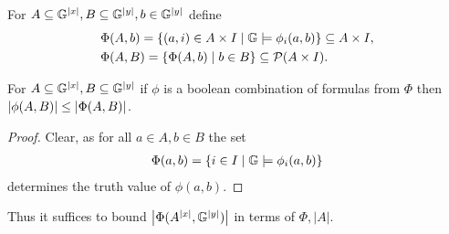\begin{Definition}
  For $A \subseteq \mathbb G^{|x|}, B \subseteq \mathbb G^{|y|}, b \in \mathbb G^{|y|}$ define
  \begin{align*}
    &\Phi(A, b) = \left\{(a, i) \in A \times I \mid \mathbb G \models \phi_i(a, b) \right\} \subseteq A \times I, \\
    &\Phi(A, B) = \left\{\Phi(A, b) \mid b \in B \right\} \subseteq \mathcal P(A \times I).
  \end{align*}  
\end{Definition}

\begin{Lemma}
  For $A \subseteq \mathbb G^{|x|}, B \subseteq \mathbb G^{|y|}$
  if $\phi$ is a boolean combination of formulas from $\Phi$ then
    $\left|\phi(A, B)\right| \leq \left|\Phi(A, B)\right|$.
\end{Lemma}
\begin{proof}
  Clear, as for all $a \in A, b \in B$ the set
  \begin{align*}
    \Phi(a, b) = \left\{i \in I \mid \mathbb G \models \phi_i(a, b)\right\}
  \end{align*}
  determines the truth value of $\phi(a,b)$.
\end{proof}

Thus it suffices to bound  $\left|\Phi(A^{|x|}, \mathbb G^{|y|})\right|$ in terms of $\Phi, |A|$.

